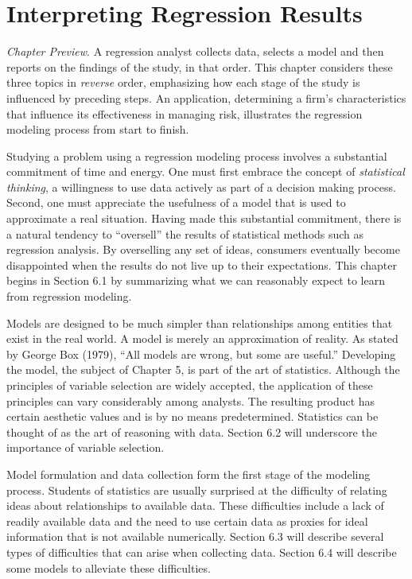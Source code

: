 \setcounter{chapter}{5}

\chapter{Interpreting Regression Results}

{\small \textit{Chapter Preview}. A regression analyst collects
data, selects a model and then reports on the findings of the study,
in that order. This chapter considers these three topics in
\emph{reverse} order, emphasizing how each stage of the study is
influenced by preceding steps. An application, determining a firm's
characteristics that influence its effectiveness in managing risk,
illustrates the regression modeling process from start to finish.}

\bigskip

\bigskip


Studying a problem using a regression modeling process involves a
substantial commitment of time and energy. One must first embrace
the concept of \emph{statistical thinking}, a willingness to use
data actively as part of a decision making process. Second, one must
appreciate the usefulness of a model that is used to approximate a
real situation. Having made this substantial commitment, there is a
natural tendency to ``oversell'' the results of statistical methods
such as regression analysis. By overselling any set of ideas,
consumers eventually become disappointed when the results do not
live up to their expectations. This chapter begins in Section 6.1 by
summarizing what we can reasonably expect to learn from regression
modeling.


Models are designed to be much simpler than relationships among
entities that exist in the real world. A model is merely an
approximation of reality. As stated by George Box (1979), ``All
models are wrong, but some are useful.'' Developing the model, the
subject of Chapter 5, is part of the art of statistics. Although the
principles of variable selection are widely accepted, the
application of these principles can vary considerably among
analysts. The resulting product has certain aesthetic values and is
by no means predetermined. Statistics can be thought of as the art
of reasoning with data. Section 6.2 will underscore the importance
of variable selection.

Model formulation and data collection form the first stage of the
modeling process. Students of statistics are usually surprised at
the difficulty of relating ideas about relationships to available
data. These difficulties include a lack of readily available data
and the need to use certain data as proxies for ideal information
that is not available numerically. Section 6.3 will describe several
types of difficulties that can arise when collecting data. Section
6.4 will describe some models to alleviate these difficulties.

